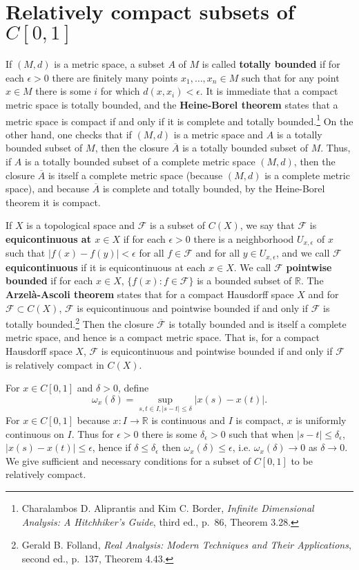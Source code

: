 \documentclass{article}
\theoremstyle{definition}
\begin{document}
\section{Relatively compact subsets of $C[0,1]$}
If $(M,d)$ is a metric space, a subset $A$ of $M$ is called \textbf{totally bounded} if for 
each $\epsilon>0$ there are finitely many points $x_1,\ldots,x_n \in M$ such that for any 
point $x \in M$ there is some $i$ for which $d(x,x_i)<\epsilon$. 
It is immediate that a compact metric space is totally bounded, and the \textbf{Heine-Borel theorem} states that
a metric space is compact if and only if it is complete and totally bounded.\footnote{Charalambos D. Aliprantis
and Kim C. Border, {\em Infinite Dimensional Analysis: A Hitchhiker's Guide}, third ed., p.~86, Theorem 3.28.}
On the other hand, one checks that if $(M,d)$ is a metric space and $A$ is a totally bounded subset of $M$, then
the closure $\overline{A}$ is a totally bounded subset of $M$. 
Thus, if $A$ is a totally bounded subset of a complete metric space $(M,d)$, then 
the closure $\overline{A}$ is itself a complete metric space (because $(M,d)$ is a complete metric space), and because $\overline{A}$ is complete and totally bounded, by the Heine-Borel
theorem it is compact.

If $X$ is a topological space and $\mathscr{F}$ is a subset of $C(X)$, we say that
$\mathscr{F}$ is \textbf{equicontinuous at $x \in X$} if for each $\epsilon>0$ there
is a neighborhood $U_{x,\epsilon}$ of $x$ such that $|f(x)-f(y)|<\epsilon$ for all $f \in \mathscr{F}$ and for all
$y \in U_{x,\epsilon}$, and we call $\mathscr{F}$ \textbf{equicontinuous} if it is equicontinuous at each $x \in X$.  
We call $\mathscr{F}$ \textbf{pointwise bounded} if for each $x \in X$, $\{f(x): f \in \mathscr{F}\}$ is a bounded subset
of $\mathbb{R}$. 
The \textbf{Arzel\`a-Ascoli theorem} states that for a compact Hausdorff space $X$ and for $\mathscr{F} \subset C(X)$,
$\mathscr{F}$ is equicontinuous and pointwise bounded if and only if $\mathscr{F}$ is totally bounded.\footnote{Gerald B. Folland, {\em Real
Analysis: Modern Techniques and Their Applications}, second ed., p.~137, Theorem 4.43.}
Then the closure $\overline{\mathscr{F}}$ is totally bounded and is itself a complete metric space, and hence
is a compact metric space. That is, for a compact Hausdorff space $X$, $\mathscr{F}$ is equicontinuous and pointwise bounded if and only if  $\mathscr{F}$ is relatively compact  in $C(X)$.

For $x \in C[0,1]$ and $\delta>0$, define
\[
\omega_x(\delta) = \sup_{s,t \in I, |s-t| \leq \delta} |x(s)-x(t)|.
\]
For $x \in C[0,1]$ because $x:I \to \mathbb{R}$ is continuous and $I$ is compact,
$x$ is uniformly continuous on $I$. Thus
for $\epsilon>0$ there is some $\delta_\epsilon>0$ such that when $|s-t| \leq \delta_\epsilon$,
$|x(s)-x(t)| \leq \epsilon$, hence
if $\delta \leq \delta_\epsilon$ then $\omega_x(\delta) \leq \epsilon$, i.e.
$\omega_x(\delta) \to 0$ as $\delta \to 0$.  We give sufficient and necessary conditions for a subset of $C[0,1]$ to be relatively compact.
\end{document}
